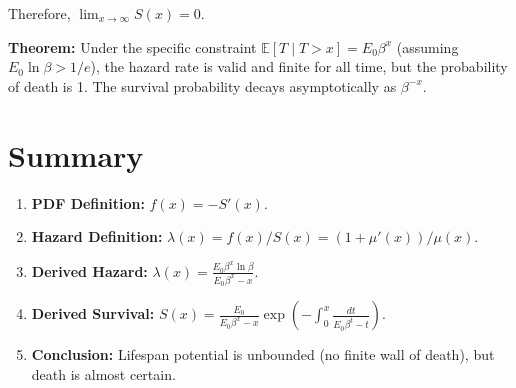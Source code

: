 \documentclass{article}
\begin{document}
	Therefore, $\lim_{x \to \infty} S(x) = 0$.
	
	\textbf{Theorem:} Under the specific constraint $\mathbb{E}[T \mid T > x] = E_0 \beta^x$ (assuming $E_0 \ln \beta > 1/e$), the hazard rate is valid and finite for all time, but the probability of death is 1. The survival probability decays asymptotically as $\beta^{-x}$.
	
	\section{Summary}
	
	\begin{enumerate}
		\item \textbf{PDF Definition:} $f(x) = -S'(x)$.
		\item \textbf{Hazard Definition:} $\lambda(x) = f(x)/S(x) = (1+\mu'(x))/\mu(x)$.
		\item \textbf{Derived Hazard:} $\lambda(x) = \frac{E_0 \beta^x \ln \beta}{E_0 \beta^x - x}$.
		\item \textbf{Derived Survival:} $S(x) = \frac{E_0}{E_0 \beta^x - x} \exp \left( - \int_0^x \frac{dt}{E_0 \beta^t - t} \right)$.
		\item \textbf{Conclusion:} Lifespan potential is unbounded (no finite wall of death), but death is almost certain.
	\end{enumerate}
	
\end{document}

